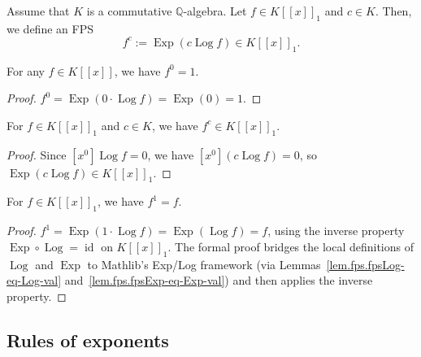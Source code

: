 \begin{definition}
\label{def.fps.power-c}
\leantarget
\leanok
Assume that $K$ is a commutative $\mathbb{Q}$-algebra.
Let $f\in K\left[  \left[  x\right]  \right]  _{1}$ and $c\in K$. Then, we
define an FPS%
\[
f^{c}:=\operatorname{Exp}\left(  c\operatorname{Log}f\right)  \in K\left[
\left[  x\right]  \right]  _{1}.
\]
\end{definition}

\begin{lemma}
\label{lem.fps.fpsPow-zero}
\leanhelper
\leanok
For any $f\in K[[x]]$, we have $f^0 = 1$.
\end{lemma}

\begin{proof}
\leanok
$f^0 = \operatorname{Exp}(0\cdot\operatorname{Log}f) = \operatorname{Exp}(0) = 1$.
\end{proof}

\begin{lemma}
\label{lem.fps.hasConstantTermOne-fpsPow}
\leanhelper
\leanok
For $f\in K[[x]]_1$ and $c\in K$, we have $f^c\in K[[x]]_1$.
\end{lemma}

\begin{proof}
\leanok
Since $[x^0]\operatorname{Log}f = 0$, we have $[x^0](c\operatorname{Log}f) = 0$,
so $\operatorname{Exp}(c\operatorname{Log}f)\in K[[x]]_1$.
\end{proof}

\begin{lemma}
\label{lem.fps.fpsPow-one}
\leanhelper
\leanok
For $f\in K[[x]]_1$, we have $f^1 = f$.
\end{lemma}

\begin{proof}
\leanok
$f^1 = \operatorname{Exp}(1\cdot\operatorname{Log}f) = \operatorname{Exp}(\operatorname{Log}f) = f$,
using the inverse property $\operatorname{Exp}\circ\operatorname{Log} = \operatorname{id}$
on $K[[x]]_1$.
The formal proof bridges the local definitions of $\operatorname{Log}$ and $\operatorname{Exp}$
to Mathlib's Exp/Log framework
(via Lemmas~\ref{lem.fps.fpsLog-eq-Log-val} and~\ref{lem.fps.fpsExp-eq-Exp-val})
and then applies the inverse property.
\end{proof}

\subsection{Rules of exponents}

